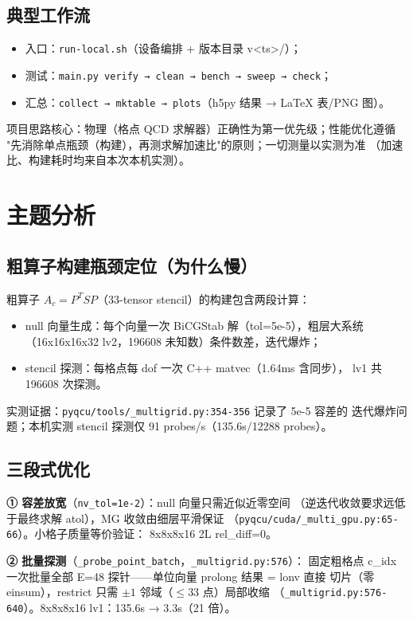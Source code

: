 \documentclass[UTF8]{ctexart}
\begin{document}
\subsection{典型工作流}
\begin{itemize}
\item 入口：\texttt{run-local.sh}（设备编排 + 版本目录 v<ts>/）；
\item 测试：\texttt{main.py verify → clean → bench → sweep → check}；
\item 汇总：\texttt{collect → mktable → plots}（h5py 结果 → LaTeX 表/PNG 图）。
\end{itemize}

\begin{ideabox}
项目思路核心：物理（格点 QCD 求解器）正确性为第一优先级；性能优化遵循
"先消除单点瓶颈（构建），再测求解加速比"的原则；一切测量以实测为准
（加速比、构建耗时均来自本次本机实测）。
\end{ideabox}

\section{主题分析}
\subsection{粗算子构建瓶颈定位（为什么慢）}
粗算子 $A_c = P^T S P$（33-tensor stencil）的构建包含两段计算：
\begin{itemize}
\item null 向量生成：每个向量一次 BiCGStab 解（tol=5e-5），粗层大系统
  （16x16x16x32 lv2，196608 未知数）条件数差，迭代爆炸；
\item stencil 探测：每格点每 dof 一次 C++ matvec（1.64ms 含同步），
  lv1 共 196608 次探测。
\end{itemize}
实测证据：\texttt{pyqcu/tools/\_multigrid.py:354-356} 记录了 5e-5 容差的
迭代爆炸问题；本机实测 stencil 探测仅 91 probes/s（135.6s/12288 probes）。

\subsection{三段式优化}
\textbf{① 容差放宽}（\texttt{nv\_tol=1e-2}）：null 向量只需近似近零空间
（逆迭代收敛要求远低于最终求解 atol），MG 收敛由细层平滑保证
（\texttt{pyqcu/cuda/\_multi\_gpu.py:65-66}）。小格子质量等价验证：
8x8x8x16 2L rel\_diff=0。

\textbf{② 批量探测}（\texttt{\_probe\_point\_batch}，\texttt{\_multigrid.py:576}）：
固定粗格点 c\_idx 一次批量全部 E=48 探针——单位向量 prolong 结果 = lonv 直接
切片（零 einsum），restrict 只需 $\pm 1$ 邻域（$\le 33$ 点）局部收缩
（\texttt{\_multigrid.py:576-640}）。8x8x8x16 lv1：135.6s → 3.3s（21 倍）。
\end{document}
